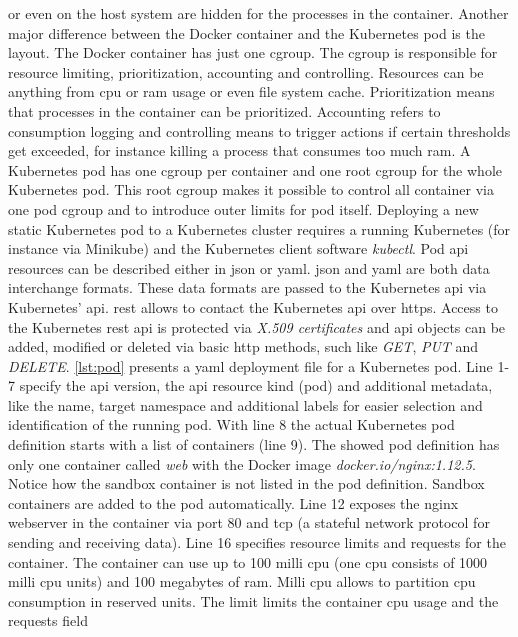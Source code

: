 \documentclass[titlepage]{report}
\begin{document}
or even on the host system are hidden for the processes in the container. Another major difference between the Docker container and the Kubernetes pod is the  layout. The Docker container has just one \gls{cgroup}. The \gls{cgroup}
is responsible for resource limiting, prioritization, accounting and controlling. Resources can be anything from \gls{cpu} or \gls{ram} usage or even file system cache\cite{singh2007containers}. Prioritization means that processes in the container can be prioritized.
Accounting refers to consumption logging and controlling means to trigger actions if certain thresholds get exceeded, for instance killing a process that consumes too much \gls{ram}. A Kubernetes pod has one \gls{cgroup} per container and one root \gls{cgroup}
for the whole Kubernetes pod. This root \gls{cgroup} makes it possible to control all container  via one pod \gls{cgroup} and to introduce outer limits for pod itself. Deploying a new static Kubernetes pod to a Kubernetes cluster requires
a running Kubernetes (for instance via Minikube) and the Kubernetes client software \emph{kubectl}. Pod \gls{api} resources can be described either in \gls{json} or \gls{yaml}. \gls{json} and \gls{yaml} are both data interchange formats. These data formats are passed to the Kubernetes
\gls{api} via Kubernetes'  \gls{api}. \gls{rest} allows to contact the Kubernetes \gls{api} over \gls{https}. Access to the Kubernetes \gls{rest} \gls{api} is protected via \emph{X.509 certificates} and \gls{api} objects can be added, modified or deleted via basic
\gls{http} methods, such like \emph{GET}, \emph{PUT} and \emph{DELETE}. \autoref{lst:pod} presents a \gls{yaml} deployment file for a Kubernetes pod. Line 1-7 specify the \gls{api} version, the \gls{api} resource kind (pod) and additional metadata, like the name,
target namespace and additional labels for easier selection and identification of the running pod. With line 8 the actual Kubernetes pod definition starts with a list of containers (line 9). The showed pod definition has only one container called \emph{web} 
with the Docker image \emph{docker.io/nginx:1.12.5}. Notice how the sandbox container is not listed in the pod definition. Sandbox containers are added to the pod automatically. Line 12 exposes the nginx webserver in the container via port 80 and \gls{tcp} (a stateful network protocol for sending and receiving data). Line 16 specifies resource limits and requests for the container.
The container can use up to 100 milli \gls{cpu} (one \gls{cpu} consists of 1000 milli \gls{cpu} units) and 100 megabytes of \gls{ram}. Milli \gls{cpu} allows to partition \gls{cpu} consumption in reserved units. The limit limits the container \gls{cpu} usage and the requests field
\end{document}
